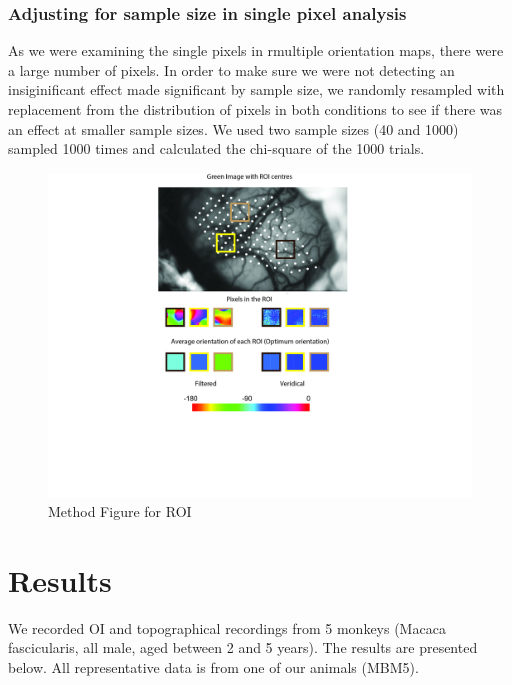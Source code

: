 		\subsubsection{Adjusting for sample size in single pixel analysis}
		
			As we were examining the single pixels in rmultiple orientation maps, there were a large number of pixels. In order to make sure we were not detecting an insiginificant effect made significant by sample size, we randomly resampled with replacement from the distribution of pixels in both conditions to see if there was an effect at smaller sample sizes. We used two sample sizes (40 and 1000) sampled 1000 times and calculated the chi-square of the 1000 trials.	
			
			\begin{figure}
								
				\includegraphics[width=\linewidth]{rb/ROI_methods.jpg}
				\caption{Method Figure for ROI}
				\label{fig:fig2}
			\end{figure}
			

			
			\pagebreak
	\section{Results}
		We recorded OI and topographical recordings from 5 monkeys (Macaca fascicularis, all male, aged between 2 and 5 years). The results are presented below. All representative data is from one of our animals (MBM5).
	
